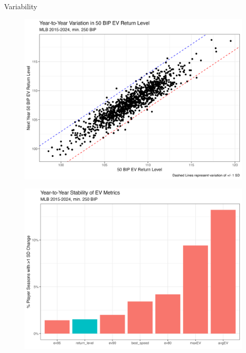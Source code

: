 \documentclass{beamer}
\begin{document}
\begin{frame}[allowframebreaks]{Variability}
    \begin{figure}
        \centering
        \includegraphics[width=0.85\linewidth]{plots/return_level_stability.png}
    \end{figure}
    \begin{figure}
        \centering
        \includegraphics[width=0.85\linewidth]{plots/stability.png}
    \end{figure}
\end{frame}

\begin{frame}[allowframebreaks]
    \printbibliography
\end{frame}
\end{document}
